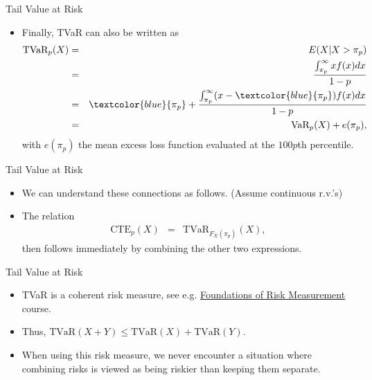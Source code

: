 \documentclass{beamer}
\begin{document}
\begin{frame}{Tail Value at Risk}
\begin{itemize}
\item Finally, TVaR can also be written as
\begin{eqnarray*}
\text{TVaR}_p(X) &=& E(X|X>\pi_p) \\
&=& \frac{\int_{\pi_p}^{\infty} x f(x)dx}{1-p} \\
&=& \textcolor{blue}{\pi_p} + \frac{\int_{\pi_p}^{\infty} (x-\textcolor{blue}{\pi_p}) f(x) dx}{1-p} \\
&=& \text{VaR}_p(X) + e(\pi_p),
\end{eqnarray*}
with $e(\pi_p)$ the mean excess loss function evaluated at the $100p$th percentile.
\end{itemize}
\end{frame}






\begin{frame}{Tail Value at Risk}
\begin{itemize}
\item We can understand these connections as follows. (Assume continuous r.v.'s)
\vspace{0.3cm}
\item The relation
\begin{eqnarray*}
\text{CTE}_p(X) &=& \text{TVaR}_{F_X(\pi_p)}(X),
\end{eqnarray*}
then follows immediately by combining the other two expressions.
\end{itemize}
\end{frame}

\begin{frame}{Tail Value at Risk}
\begin{itemize}
\item TVaR is a coherent risk measure, see e.g. \href{http://onderwijsaanbod.kuleuven.be/syllabi/e/D0R57BE.htm\#activetab=doelstellingen_idp1406608}{Foundations of Risk Measurement} course.
\vspace{0.3cm}
\item Thus, $\text{TVaR}(X+Y) \leq \text{TVaR}(X)+\text{TVaR}(Y)$.
\vspace{0.3cm}
\item When using this risk measure, we never encounter a situation where combining risks is viewed as being riskier than keeping them separate.
\end{itemize}
\end{frame}
\end{document}
